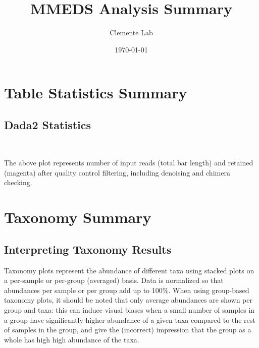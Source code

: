 \documentclass[10pt,notitlepage,onecolumn,aps,pra]{revtex4-1}
\begin{document}
    
    \title{MMEDS Analysis Summary}\author{Clemente Lab}

\date{\today}
\maketitle


    
    

    
    \hypertarget{table-statistics-summary}{%
\section{Table Statistics Summary}\label{table-statistics-summary}}

    \hypertarget{dada2-statistics}{%
\subsection{Dada2 Statistics}\label{dada2-statistics}}

    
    \begin{center}
    \end{center}
    { \hspace*{\fill} \\}
    

    The above plot represents number of input reads (total bar length) and
retained (magenta) after quality control filtering, including denoising
and chimera checking.

    \pagebreak

    \hypertarget{taxonomy-summary}{%
\section{Taxonomy Summary}\label{taxonomy-summary}}

    \hypertarget{interpreting-taxonomy-results}{%
\subsection{Interpreting Taxonomy
Results}\label{interpreting-taxonomy-results}}

    Taxonomy plots represent the abundance of different taxa using stacked
plots on a per-sample or per-group (averaged) basis. Data is normalized
so that abundances per sample or per group add up to 100\%. When using
group-based taxonomy plots, it should be noted that only average
abundances are shown per group and taxa: this can induce visual biases
when a small number of samples in a group have significantly higher
abundance of a given taxa compared to the rest of samples in the group,
and give the (incorrect) impression that the group as a whole has high
high abundance of the taxa.
\end{document}
